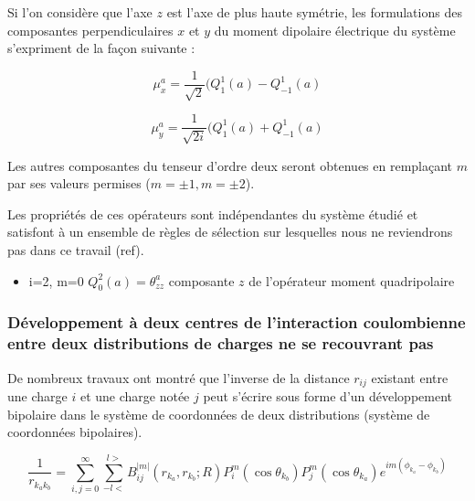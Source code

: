 	Si l'on considère que l'axe $z$ est l'axe de plus haute symétrie, les formulations des composantes perpendiculaires $x$ et $y$ du moment dipolaire électrique du système s'expriment de la façon suivante : 
	
	\begin{equation}
	\mu_{x}^{a} = \frac{1}{\sqrt{2}} (Q_{1}^{1}(a)- Q_{-1}^{1}(a)
	\end{equation}
	
	\begin{equation}
	\mu_{y}^{a} = \frac{1}{\sqrt{2i}} (Q_{1}^{1}(a)+ Q_{-1}^{1}(a)
	\end{equation}
	
	Les autres composantes du tenseur d'ordre deux seront obtenues en remplaçant $m$ par ses valeurs permises ($m=\pm 1, m=\pm 2$).
	
	Les propriétés de ces opérateurs sont indépendantes du système étudié et satisfont à un ensemble de règles de sélection sur lesquelles nous ne reviendrons pas dans ce travail (ref). 
	
	\begin{itemize}
		\item i=2, m=0 \hspace{1cm} $Q_{0}^{2}(a) = \theta_{zz}^{a}$ \hspace{1cm} composante $z$ de l'opérateur moment quadripolaire 
	\end{itemize}
	
	\subsubsection{Développement à deux centres de l'interaction coulombienne entre deux distributions de charges ne se recouvrant pas}
	
	De nombreux travaux \cite{buehler1951bipolar,hylleraas1931elektronenterme,proctor1977long,davison1968atomic} ont montré que l'inverse de la distance $r_{ij}$ existant entre une charge $i$ et une charge notée $j$ peut s'écrire sous forme d'un développement bipolaire dans le système de coordonnées de deux distributions (système de coordonnées bipolaires).
	
	\begin{equation}
	\frac{1}{r_{k_{a}k_{b}}} = \sum_{i,j=0}^{\infty} \sum_{-l<}^{l>} B_{ij}^{|m|}(r_{k_{a}}, r_{k_{b}}; R) P_{i}^{m} (\cos\theta_{k_{b}}) P_{j}^{m}(\cos\theta_{k_{a}}) e^{im(\phi_{k_{a}}-\phi_{k_{b}})}
	\end{equation}
	

